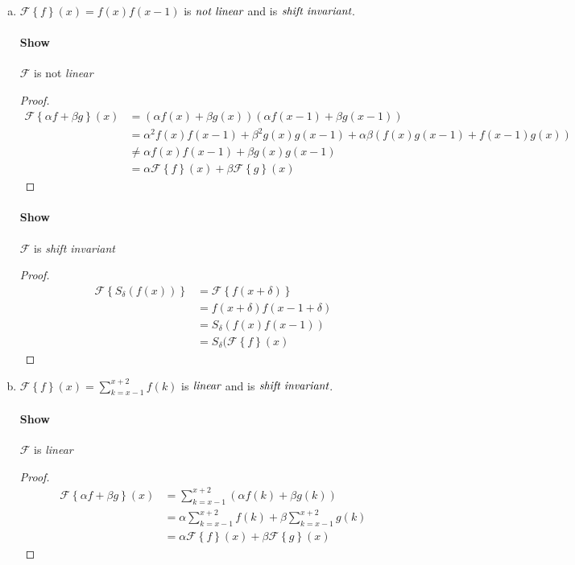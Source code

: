 \documentclass{paper}
\begin{document}
\begin{enumerate}[(a)]
\item $\mathcal{F} \left \{ f \right\} (x) = f(x)f(x-1)$ is $\emph{not linear}$ and is $\emph{shift invariant}$.

\paragraph{Show} $\mathcal{F}$ is not \emph{linear} \\
\begin{proof}
\begin{align*}
    \mathcal{F} \left \{\alpha f + \beta g \right\}(x)
    &= (\alpha f(x) + \beta g(x))(\alpha f(x-1) + \beta g(x-1)) \\
    &= \alpha^2 f(x)f(x-1) + \beta^2 g(x)g(x-1) + \alpha \beta (f(x)g(x-1)+f(x-1)g(x)) \\
    &\neq \alpha f(x)f(x-1) + \beta g(x)g(x-1) \\
    &= \alpha \mathcal{F} \left \{f\right\}(x) + \beta \mathcal{F} \left \{g \right\}(x)
\end{align*}
\end{proof}

\paragraph{Show} $\mathcal{F}$ is \emph{shift invariant} \\
\begin{proof}
\begin{align*}
    \mathcal{F} \left \{S_\delta (f(x)) \right\} 
    &= \mathcal{F} \left\{ f(x+\delta) \right\} \\
    &= f(x+\delta)f(x-1+\delta) \\
    &= S_{\delta}(f(x)f(x-1)) \\
    &= S_\delta(\mathcal{F}\left \{f \right\}(x)
\end{align*}
\end{proof}

\item $\mathcal{F} \left \{ f \right\} (x) = \sum_{k=x-1}^{x+2}f(k)$ is $\emph{linear}$ and is $\emph{shift invariant}$.

\paragraph{Show} $\mathcal{F}$ is \emph{linear} \\
\begin{proof}
\begin{align*}
    \mathcal{F} \left \{\alpha f + \beta g \right\}(x)
    &= \sum_{k=x-1}^{x+2}(\alpha f(k) + \beta g(k)) \\
    &= \alpha \sum_{k=x-1}^{x+2} f(k) + \beta \sum_{k=x-1}^{x+2} g(k) \\
    &= \alpha \mathcal{F} \left \{f\right\}(x) + \beta \mathcal{F} \left \{g \right\}(x)
\end{align*}
\end{proof}


\end{enumerate}
\end{document}
